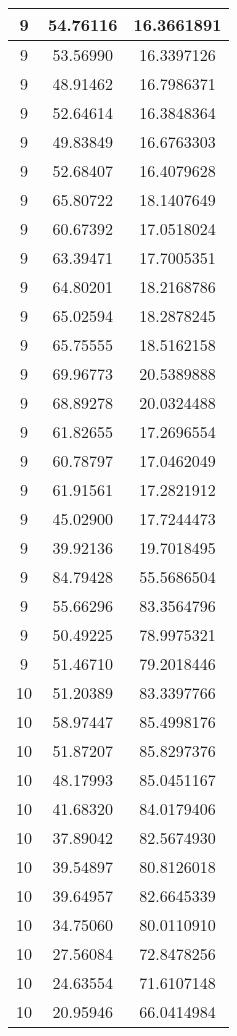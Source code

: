 \documentclass[
]{book}
\begin{document}
\begin{tabular}{c|c|c}
\hline
9 & 54.76116 & 16.3661891\\
\hline
9 & 53.56990 & 16.3397126\\
\hline
9 & 48.91462 & 16.7986371\\
\hline
9 & 52.64614 & 16.3848364\\
\hline
9 & 49.83849 & 16.6763303\\
\hline
9 & 52.68407 & 16.4079628\\
\hline
9 & 65.80722 & 18.1407649\\
\hline
9 & 60.67392 & 17.0518024\\
\hline
9 & 63.39471 & 17.7005351\\
\hline
9 & 64.80201 & 18.2168786\\
\hline
9 & 65.02594 & 18.2878245\\
\hline
9 & 65.75555 & 18.5162158\\
\hline
9 & 69.96773 & 20.5389888\\
\hline
9 & 68.89278 & 20.0324488\\
\hline
9 & 61.82655 & 17.2696554\\
\hline
9 & 60.78797 & 17.0462049\\
\hline
9 & 61.91561 & 17.2821912\\
\hline
9 & 45.02900 & 17.7244473\\
\hline
9 & 39.92136 & 19.7018495\\
\hline
9 & 84.79428 & 55.5686504\\
\hline
9 & 55.66296 & 83.3564796\\
\hline
9 & 50.49225 & 78.9975321\\
\hline
9 & 51.46710 & 79.2018446\\
\hline
10 & 51.20389 & 83.3397766\\
\hline
10 & 58.97447 & 85.4998176\\
\hline
10 & 51.87207 & 85.8297376\\
\hline
10 & 48.17993 & 85.0451167\\
\hline
10 & 41.68320 & 84.0179406\\
\hline
10 & 37.89042 & 82.5674930\\
\hline
10 & 39.54897 & 80.8126018\\
\hline
10 & 39.64957 & 82.6645339\\
\hline
10 & 34.75060 & 80.0110910\\
\hline
10 & 27.56084 & 72.8478256\\
\hline
10 & 24.63554 & 71.6107148\\
\hline
10 & 20.95946 & 66.0414984\\

\end{tabular}
\end{document}
